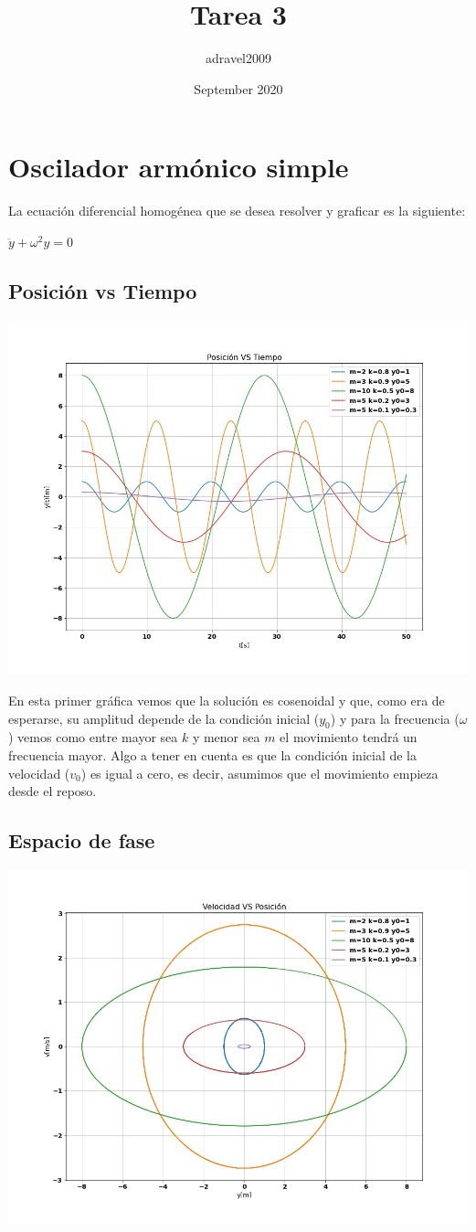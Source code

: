 \documentclass{article}
\title{Tarea 3}
\author{adravel2009 }
\date{September 2020}
\begin{document}
\maketitle

\section{Oscilador armónico simple}

La ecuación diferencial homogénea que se desea resolver y graficar es la siguiente:

\medskip


$\ddot{y} + \omega^2 y=0$

\subsection{Posición vs Tiempo}

\includegraphics[width=0.7\linewidth]{posición.jpg}

En esta primer gráfica vemos que la solución es cosenoidal y que, como era de esperarse, su amplitud depende de la condición inicial ($y_0$) y para la frecuencia ($\omega$) vemos como entre mayor sea $k$ y menor sea $m$ el movimiento tendrá un frecuencia mayor. Algo a tener en cuenta es que la condición inicial de la velocidad ($v_0$) es igual a cero, es decir, asumimos que el movimiento empieza desde el reposo.

\subsection{Espacio de fase}

\includegraphics[width=0.7\linewidth]{fases1.jpg}
\end{document}
